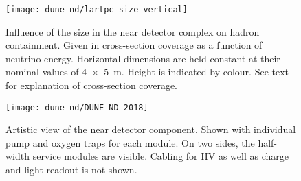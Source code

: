 \begin{figure}[htb]
	\centering
	\texttt{[image: dune\_nd/lartpc\_size\_vertical]}
	\caption{Influence of the \lartpc{} size in the \dune{} near detector complex on hadron containment.
		Given in cross-section coverage as a function of neutrino energy.
		Horizontal dimensions are held constant at their nominal values of \SI{4 x 5}{\metre}.
		Height is indicated by colour.
		See text for explanation of cross-section coverage.}
	\label{fig:dune-nd_lartpc-size}
\end{figure}

\begin{figure}[htb]
	\centering
	\texttt{[image: dune\_nd/DUNE-ND-2018]}
	\caption{Artistic view of the \dune{} near detector \AC{} component.
		Shown with individual pump and oxygen traps for each module.
		On two sides, the half-width service modules are visible.
		Cabling for HV as well as charge and light readout is not shown.}
	\label{fig:dune-nd_ac}
\end{figure}

